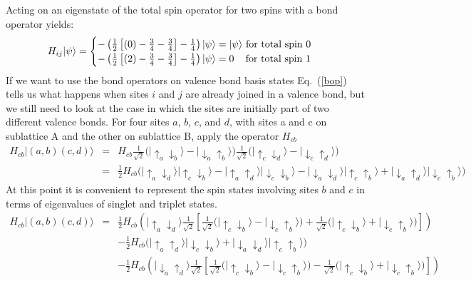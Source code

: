Acting on an eigenstate of the total spin operator for two spins with a bond operator yields:
\begin{equation}
H_{ij}\lvert \psi \rangle = \begin{cases}
	-\left(\tfrac{1}{2} \left[(0) - \tfrac{3}{4} - \tfrac{3}{4}\right] -\tfrac{1}{4}\right)\lvert\psi\rangle 
	= \lvert\psi\rangle \text{ for total spin 0}\\
	 -\left(\tfrac{1}{2} \left[(2) - \tfrac{3}{4}- \tfrac{3}{4}\right]-\tfrac{1}{4}\right)\lvert\psi\rangle
	 = 0 \text{ \;\;\;for total spin 1}
	 \end{cases}
	 \label{bop}
\end{equation}
If we want to use the bond operators on valence bond basis states Eq.~(\ref{bop}) tells
us what happens when sites $i$ and $j$ are already joined in a valence bond, but we still
need to look at the case in which the sites are initially part of two different valence bonds.
For four sites $a$, $b$, $c$, and $d$, with sites a and c on sublattice A 
and the other on sublattice B,
apply the operator $H_{cb}$
\begin{eqnarray}
H_{cb}\lvert(a,b)(c,d)\rangle &=& H_{cb}
	\tfrac{1}{\sqrt{2}} \big( 
	\lvert \uparrow_a \downarrow_b \rangle - \lvert \downarrow_a \uparrow_b \rangle 
	\big) 
	\tfrac{1}{\sqrt{2}} \big( 
	\lvert \uparrow_c \downarrow_d \rangle - \lvert \downarrow_c \uparrow_d \rangle 
	\big) \nonumber \\ 
	&=&
	  \tfrac{1}{2} H_{cb} \big(
	   \lvert\uparrow_a \downarrow_d\rangle \lvert \uparrow_c \downarrow_b \rangle
	   - \lvert \uparrow_a \uparrow_d \rangle \lvert \downarrow_c \downarrow_b \rangle
	   - \lvert \downarrow_a \downarrow_d \rangle \lvert \uparrow_c \uparrow_b \rangle
	   + \lvert \downarrow_a \uparrow_d \rangle \lvert \downarrow_c \uparrow_b \rangle
	   \big) \nonumber
\end{eqnarray}
At this point it is convenient to represent the spin states involving sites $b$ and $c$
in terms of eigenvalues of singlet and triplet states.
\begin{eqnarray}
H_{cb}\lvert(a,b)(c,d)\rangle &=&
	     \tfrac{1}{2} H_{cb} \left( \lvert\uparrow_a \downarrow_d \rangle 
	     \tfrac{1}{ \sqrt{2}} \left[ 
	     	\tfrac{1}{ \sqrt{2}} \big(
	     	\lvert \uparrow_c \downarrow_b \rangle - \lvert \downarrow_c \uparrow_b \rangle 
	     \big) + 
	     \tfrac{1}{ \sqrt{2}} \big(
	     \lvert \uparrow_c \downarrow_b \rangle + \lvert \downarrow_c \uparrow_b \rangle 
	     \big)
	     \right]
	     \right) \nonumber \\
	     &&
	     -   \tfrac{1}{2} H_{cb}
	     \Big(\lvert \uparrow_a \uparrow_d \rangle \lvert \downarrow_c \downarrow_b \rangle
	   + \lvert \downarrow_a \downarrow_d \rangle \lvert \uparrow_c \uparrow_b \rangle
	   \Big) \\
	   && - 	     \tfrac{1}{2} H_{cb} \left( \lvert\downarrow_a \uparrow_d \rangle 
	     \tfrac{1}{ \sqrt{2}} \left[ 
	     	\tfrac{1}{ \sqrt{2}} \big(
	     	\lvert \uparrow_c \downarrow_b \rangle - \lvert \downarrow_c \uparrow_b \rangle 
	     \big) -
	     \tfrac{1}{ \sqrt{2}} \big(
	     \lvert \uparrow_c \downarrow_b \rangle + \lvert \downarrow_c \uparrow_b \rangle 
	     \big)
	     \right]
	     \right) \nonumber
\end{eqnarray}
